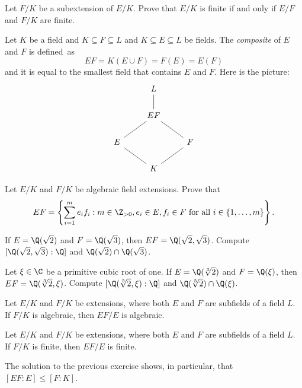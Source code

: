 \begin{exercise}
\label{xca:tower of finite extensions}
	Let $F/K$ be a subextension of $E/K$. Prove that $E/K$ is finite 
	if and only if $E/F$ and $F/K$ are finite. 
\end{exercise}

Let $K$ be a field and $K\subseteq 
F\subseteq L$ and $K\subseteq E\subseteq L$ be fields. The \emph{composite}  
of $E$ and $F$ is defined~as 
\[
EF=K(E\cup F)=F(E)=E(F)
\]
and it is equal to the 
smallest field that contains $E$ and $F$. Here is the
picture:
\[\begin{tikzcd}
	& L \\
	& EF \\
	E && F \\
	& K
	\arrow[no head, from=1-2, to=2-2]
	\arrow[no head, from=2-2, to=3-1]
	\arrow[no head, from=2-2, to=3-3]
	\arrow[no head, from=3-1, to=4-2]
	\arrow[no head, from=4-2, to=3-3]
\end{tikzcd}\]


\begin{exercise}
\label{xca:composite generated by products}
    Let $E/K$ and $F/K$ be algebraic field extensions. 
    Prove that 
    \[
    EF=\left\{\sum_{i=1}^me_if_i:m\in\Z_{>0},e_i\in E,f_i\in F\text{ for all $i\in\{1,\dots,m\}$}\right\}.
    \]
\end{exercise}

\begin{exercise}
\label{xca:sqrt(2),sqrt(3)}
    If $E=\Q(\sqrt{2})$ and $F=\Q(\sqrt{3})$, then $EF=\Q(\sqrt{2},\sqrt{3})$. 
    Compute $[\Q(\sqrt{2},\sqrt{3}):\Q]$ and 
    $\Q(\sqrt{2})\cap\Q(\sqrt{3})$. 
\end{exercise}

\begin{exercise}
\label{xca:sqrt[3]2,3rd root of 1}
    Let $\xi\in\C$ be a primitive cubic root of one. 
    If $E=\Q(\sqrt[3]{2})$ and $F=\Q(\xi)$, then $EF=\Q(\sqrt[3]{2},\xi)$. 
    Compute $[\Q(\sqrt[3]{2},\xi):\Q]$ and 
    $\Q(\sqrt[3]{2})\cap\Q(\xi)$. 
\end{exercise}

\begin{exercise}
\label{xca: shift for algebraic}
	Let $E/K$ and $F/K$ be extensions, where both $E$ and $F$ are subfields of 
	a field $L$. If $F/K$ is algebraic, then $EF/E$ is algebraic.
\end{exercise}


\begin{exercise}
\label{xca: shift for finite}
	Let $E/K$ and $F/K$ be extensions, where both $E$ and $F$ are subfields of 
	a field $L$. If $F/K$ is finite, then $EF/E$ is finite.
\end{exercise}

The solution to the previous exercise shows, in particular, that $[EF:E]\leq [F:K]$. 
